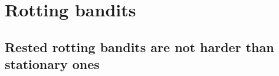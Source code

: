 \part{Rotting bandits}

\chapter{Rested rotting bandits are not harder than stationary ones}






%